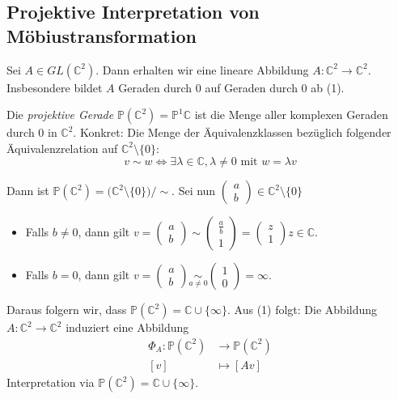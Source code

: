 \documentclass[../main.tex]{subfiles}
\begin{document}
\subsection*{Projektive Interpretation von Möbiustransformation}
Sei $A \in GL(\mathbb{C}^2)$. Dann erhalten wir eine lineare Abbildung
$A : \mathbb{C}^2 \to \mathbb{C}^2$. Insbesondere bildet $A$ Geraden durch 0 auf
Geraden durch 0 ab (1).
\begin{definition}
    Die \emph{projektive Gerade} $\mathbb{P}(\mathbb{C}^2) = \mathbb{P}^1\mathbb{C}$ ist die Menge
    aller komplexen Geraden durch 0 in $\mathbb{C}^2$. Konkret:
    Die Menge der Äquivalenzklassen bezüglich folgender Äquivalenzrelation auf $\mathbb{C}^2 \setminus \{0\}$:
    $$v \sim w \iff \exists \lambda \in \mathbb{C}, \lambda \not = 0 \text{ mit }w = \lambda v$$
\end{definition}

Dann ist 
$\mathbb{P}(\mathbb{C}^2) = \big (\mathbb{C}^2 \setminus \{0\} \big ) / \sim$.
Sei nun $\begin{pmatrix}
    a \\ b
\end{pmatrix} \in \mathbb{C}^2 \setminus \{0\}$
\begin{itemize}
    \item Falls $b \not = 0$, dann gilt 
    $v=\begin{pmatrix}
        a \\b
    \end{pmatrix} \sim \begin{pmatrix}
    \frac{a}{b} \\1
    \end{pmatrix} = \begin{pmatrix}
        z \\1
        \end{pmatrix}
    z \in \mathbb{C}$.

    \item Falls $b=0$, dann gilt
    $v=\begin{pmatrix}
        a \\b
    \end{pmatrix} \underset{a \not = 0}{\sim} \begin{pmatrix}
    1 \\ 0
    \end{pmatrix} = \infty$.

\end{itemize}
Daraus folgern wir, dass $\mathbb{P}(\mathbb{C}^2) = \mathbb{C} \cup \{ \infty \}$.
Aus (1) folgt: Die Abbildung $A : \mathbb{C}^2 \to \mathbb{C}^2$ induziert eine Abbildung
\begin{align*}
    \Phi _A : \mathbb{P}(\mathbb{C}^2) & \to \mathbb{P}(\mathbb{C}^2) \\
    [v] & \mapsto [Av]
\end{align*}
Interpretation via $\mathbb{P}(\mathbb{C}^2) = \mathbb{C} \cup  \{ \infty \}$.
\end{document}
